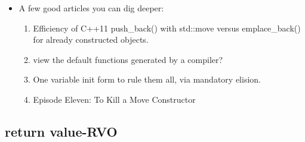 \documentclass[a4paper,11pt,twoside]{book}
\begin{document}
\begin{itemize}
\begin{enumerate}
	\end{enumerate}

	\item A few good articles you can dig deeper:
	\begin{enumerate}
		\item Efficiency of C++11 push\_back() with std::move versus emplace\_back() for already constructed objects.
		\item view the default functions generated by a compiler?
		\item One variable init form to rule them all, via mandatory elision.
		\item Episode Eleven: To Kill a Move Constructor
	\end{enumerate}

\end{itemize}

\subsection{return value-RVO}
\end{document}
